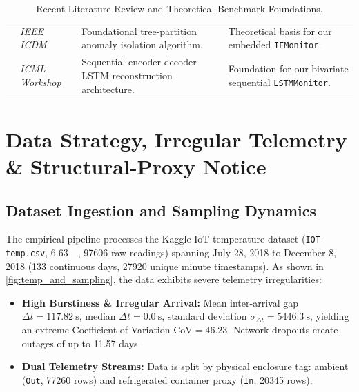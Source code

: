\documentclass[11pt,a4paper,oneside]{article}
\begin{document}
\begin{table}[H]
\begin{tabularx}{\textwidth}{L{3.0cm} L{3.5cm} Y Y}
\addlinespace
\textbf{\citet{liu2008isolation}} & \textit{IEEE ICDM} & Foundational tree-partition anomaly isolation algorithm. & Theoretical basis for our embedded \texttt{IFMonitor}. \\
\addlinespace
\textbf{\citet{malhotra2016lstm}} & \textit{ICML Workshop} & Sequential encoder-decoder LSTM reconstruction architecture. & Foundation for our bivariate sequential \texttt{LSTMMonitor}. \\
\bottomrule
\end{tabularx}
\caption{Recent Literature Review and Theoretical Benchmark Foundations.}
\label{tab:literature_review}
\end{table}

\section{Data Strategy, Irregular Telemetry \& Structural-Proxy Notice}

\subsection{Dataset Ingestion and Sampling Dynamics}
The empirical pipeline processes the Kaggle IoT temperature dataset (\texttt{IOT-temp.csv}, \SI{6.63}{\mega\byte}, \num{97606} raw readings) spanning July 28, 2018 to December 8, 2018 (133 continuous days, \num{27920} unique minute timestamps). As shown in \cref{fig:temp_and_sampling}, the data exhibits severe telemetry irregularities:
\begin{itemize}[leftmargin=1.5em, itemsep=2pt, topsep=1pt]
    \item \textbf{High Burstiness \& Irregular Arrival:} Mean inter-arrival gap $\Delta t = \SI{117.82}{\second}$, median $\Delta t = \SI{0.0}{\second}$, standard deviation $\sigma_{\Delta t} = \SI{5446.3}{\second}$, yielding an extreme Coefficient of Variation $\text{CoV} = 46.23$. Network dropouts create outages of up to 11.57 days.
    \item \textbf{Dual Telemetry Streams:} Data is split by physical enclosure tag: ambient (\texttt{Out}, \num{77260} rows) and refrigerated container proxy (\texttt{In}, \num{20345} rows).
\end{itemize}
\end{document}
